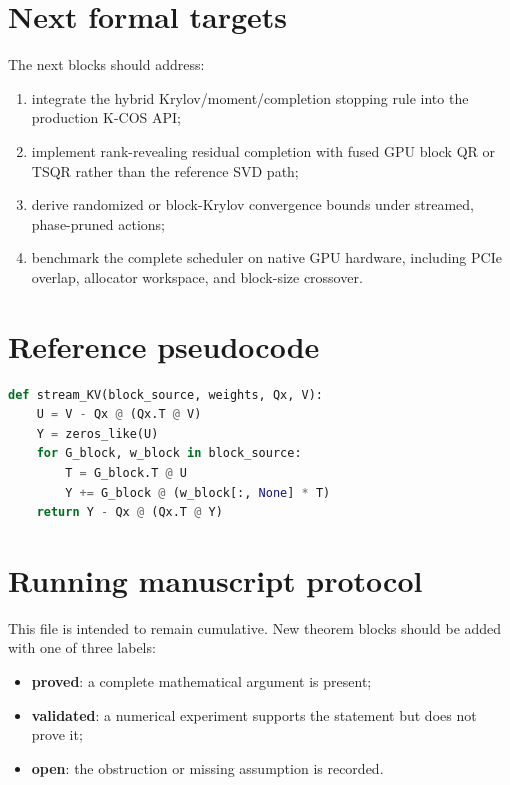 \documentclass[11pt]{article}
\theoremstyle{definition}
\theoremstyle{remark}
\begin{document}
\section{Next formal targets}

The next blocks should address:

\begin{enumerate}
\item integrate the hybrid Krylov/moment/completion stopping rule into the
production K-COS API;
\item implement rank-revealing residual completion with fused GPU block QR or
TSQR rather than the reference SVD path;
\item derive randomized or block-Krylov convergence bounds under streamed,
phase-pruned actions;
\item benchmark the complete scheduler on native GPU hardware, including
PCIe overlap, allocator workspace, and block-size crossover.
\end{enumerate}

\appendix

\section{Reference pseudocode}

\begin{lstlisting}[language=Python]
def stream_KV(block_source, weights, Qx, V):
    U = V - Qx @ (Qx.T @ V)
    Y = zeros_like(U)
    for G_block, w_block in block_source:
        T = G_block.T @ U
        Y += G_block @ (w_block[:, None] * T)
    return Y - Qx @ (Qx.T @ Y)
\end{lstlisting}

\section{Running manuscript protocol}

This file is intended to remain cumulative.  New theorem blocks should be
added with one of three labels:

\begin{itemize}
\item \textbf{proved}: a complete mathematical argument is present;
\item \textbf{validated}: a numerical experiment supports the statement but
does not prove it;
\item \textbf{open}: the obstruction or missing assumption is recorded.
\end{itemize}
\end{document}
